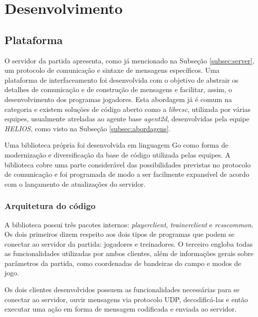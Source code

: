 \chapter{Desenvolvimento}
\label{chap:Desenvolvimento}




\section{Plataforma} \label{sec:lib}
\par O servidor da partida apresenta, como já mencionado na Subseção \ref{subsec:server}, um protocolo de comunicação e sintaxe de mensagens específicos. Uma plataforma de interfaceamento foi desenvolvida com o objetivo de abstrair os detalhes de comunicação e de construção de mensagens e facilitar, assim, o desenvolvimento dos programas jogadores. Esta abordagem já é comum na categoria e existem soluções de código aberto como a \textit{librcsc}, utilizada por várias equipes, usualmente atreladas ao agente base \textit{agent2d}, desenvolvidas pela equipe \textit{HELIOS}, como visto na Subseção \ref{subsec:abordagens}.
\par Uma biblioteca própria foi desenvolvida em linguagem Go como forma de modernização e diversificação da base de código utilizada pelas equipes. A biblioteca cobre uma parte considerável das possibilidades previstas no protocolo de comunicação e foi programada de modo a ser facilmente expansível de acordo com o lançamento de atualizações do servidor.

\subsection{Arquitetura do código}
A biblioteca possui três pacotes internos: \textit{playerclient}, \textit{trainerclient} e \textit{rcsscommon}. Os dois primeiros dizem respeito aos dois tipos de programas que podem se conectar ao servidor da partida: jogadores e treinadores. O terceiro engloba todas as funcionalidades utilizadas por ambos clientes, além de informações gerais sobre parâmetros da partida, como coordenadas de bandeiras do campo e modos de jogo.

Os dois clientes desenvolvidos possuem as funcionalidades necessárias para se conectar ao servidor, ouvir mensagens via protocolo UDP, decodificá-las e então executar uma ação em forma de mensagem codificada e enviada ao servidor.

